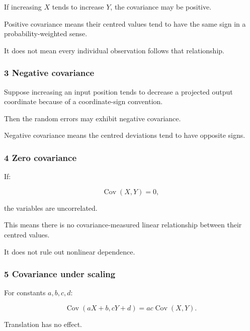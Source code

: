 If increasing \(X\) tends to increase \(Y\), the covariance may be positive.

Positive covariance means their centred values tend to have the same sign in a probability-weighted sense.

It does not mean every individual observation follows that relationship.

\subsubsection{3 Negative covariance}\label{02-foundations-ii-ch023-negative-covariance}

\hypertarget{02-foundations-ii-ch023-negative-covariance}{}

Suppose increasing an input position tends to decrease a projected output coordinate because of a coordinate-sign convention.

Then the random errors may exhibit negative covariance.

Negative covariance means the centred deviations tend to have opposite signs.

\subsubsection{4 Zero covariance}\label{02-foundations-ii-ch023-zero-covariance}

\hypertarget{02-foundations-ii-ch023-zero-covariance}{}

If:

\[
 \operatorname{Cov}(X,Y)=0,
\]

the variables are uncorrelated.

This means there is no covariance-measured linear relationship between their centred values.

It does not rule out nonlinear dependence.

\subsubsection{5 Covariance under scaling}\label{02-foundations-ii-ch023-covariance-under-scaling}

\hypertarget{02-foundations-ii-ch023-covariance-under-scaling}{}

For constants \(a,b,c,d\):

\[
 \boxed{ \operatorname{Cov}(aX+b,cY+d) = ac\operatorname{Cov}(X,Y) }.
\]

Translation has no effect.

